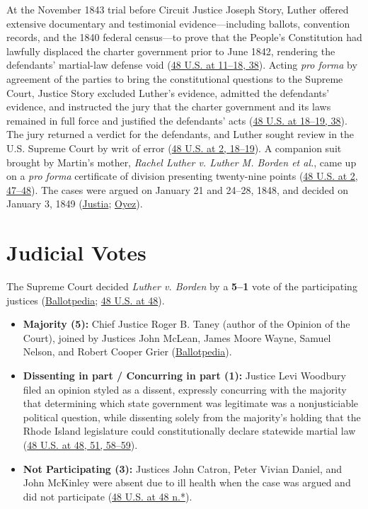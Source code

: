 \documentclass[12pt]{article}
\begin{document}
At the November 1843 trial before Circuit Justice Joseph Story, Luther offered extensive documentary and testimonial evidence---including ballots, convention records, and the 1840 federal census---to prove that the People's Constitution had lawfully displaced the charter government prior to June 1842, rendering the defendants' martial-law defense void (\href{https://supreme.justia.com/cases/federal/us/48/1/}{48 U.S. at 11--18, 38}). Acting \textit{pro forma} by agreement of the parties to bring the constitutional questions to the Supreme Court, Justice Story excluded Luther's evidence, admitted the defendants' evidence, and instructed the jury that the charter government and its laws remained in full force and justified the defendants' acts (\href{https://supreme.justia.com/cases/federal/us/48/1/}{48 U.S. at 18--19, 38}). The jury returned a verdict for the defendants, and Luther sought review in the U.S. Supreme Court by writ of error (\href{https://supreme.justia.com/cases/federal/us/48/1/}{48 U.S. at 2, 18--19}). A companion suit brought by Martin's mother, \textit{Rachel Luther v. Luther M. Borden et al.}, came up on a \textit{pro forma} certificate of division presenting twenty-nine points (\href{https://supreme.justia.com/cases/federal/us/48/1/}{48 U.S. at 2, 47--48}). The cases were argued on January 21 and 24--28, 1848, and decided on January 3, 1849 (\href{https://supreme.justia.com/cases/federal/us/48/1/}{Justia}; \href{https://www.oyez.org/cases/1789-1850/48us1}{Oyez}).

\section{Judicial Votes}

The Supreme Court decided \textit{Luther v. Borden} by a \textbf{5--1} vote of the participating justices (\href{https://ballotpedia.org/Luther_v._Borden}{Ballotpedia}; \href{https://supreme.justia.com/cases/federal/us/48/1/}{48 U.S. at 48}).

\begin{itemize}
\item \textbf{Majority (5):} Chief Justice Roger B. Taney (author of the Opinion of the Court), joined by Justices John McLean, James Moore Wayne, Samuel Nelson, and Robert Cooper Grier (\href{https://ballotpedia.org/Luther_v._Borden}{Ballotpedia}).
\item \textbf{Dissenting in part / Concurring in part (1):} Justice Levi Woodbury filed an opinion styled as a dissent, expressly concurring with the majority that determining which state government was legitimate was a nonjusticiable political question, while dissenting solely from the majority's holding that the Rhode Island legislature could constitutionally declare statewide martial law (\href{https://supreme.justia.com/cases/federal/us/48/1/}{48 U.S. at 48, 51, 58--59}).
\item \textbf{Not Participating (3):} Justices John Catron, Peter Vivian Daniel, and John McKinley were absent due to ill health when the case was argued and did not participate (\href{https://supreme.justia.com/cases/federal/us/48/1/}{48 U.S. at 48 n.*}).
\end{itemize}
\end{document}
